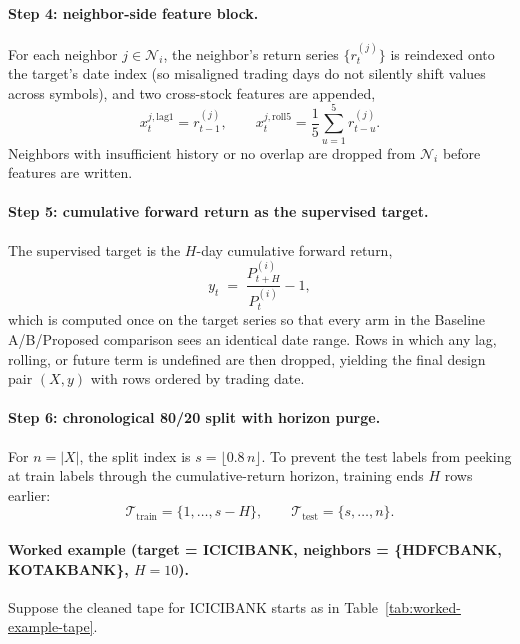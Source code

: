 \documentclass[12pt,a4paper,titlepage]{article}
\begin{document}
\paragraph{Step 4: neighbor-side feature block.}
For each neighbor \(j\in\mathcal{N}_i\), the neighbor's return series \(\{r_t^{(j)}\}\) is reindexed onto the target's date index (so misaligned trading days do not silently shift values across symbols), and two cross-stock features are appended,
\begin{equation}
x_t^{j,\text{lag1}} = r_{t-1}^{(j)},\qquad
x_t^{j,\text{roll5}} = \frac{1}{5}\sum_{u=1}^{5} r_{t-u}^{(j)}.
\label{eq:nbr-features}
\end{equation}
Neighbors with insufficient history or no overlap are dropped from \(\mathcal{N}_i\) before features are written.

\paragraph{Step 5: cumulative forward return as the supervised target.}
The supervised target is the \(H\)-day cumulative forward return,
\begin{equation}
y_t \;=\; \frac{P_{t+H}^{(i)}}{P_t^{(i)}}-1,
\label{eq:cumulative-target}
\end{equation}
which is computed once on the target series so that every arm in the Baseline A/B/Proposed comparison sees an identical date range. Rows in which any lag, rolling, or future term is undefined are then dropped, yielding the final design pair \((X, y)\) with rows ordered by trading date.

\paragraph{Step 6: chronological 80/20 split with horizon purge.}
For \(n=|X|\), the split index is \(s=\lfloor 0.8\,n\rfloor\). To prevent the test labels from peeking at train labels through the cumulative-return horizon, training ends \(H\) rows earlier:
\begin{equation}
\mathcal{T}_{\text{train}}=\{1,\dots,s-H\},\qquad
\mathcal{T}_{\text{test}}=\{s,\dots,n\}.
\label{eq:purged-split}
\end{equation}

\paragraph{Worked example (target = ICICIBANK, neighbors = \{HDFCBANK, KOTAKBANK\}, \(H=10\)).}
Suppose the cleaned tape for ICICIBANK starts as in Table~\ref{tab:worked-example-tape}.
\end{document}
